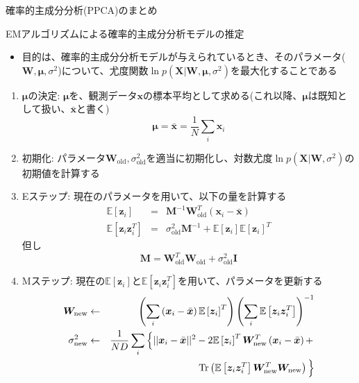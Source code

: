 \documentclass[dvipdfmx,notheorems,t]{beamer}
\begin{document}
\begin{frame}{確率的主成分分析(PPCA)のまとめ}

\begin{block}{EMアルゴリズムによる確率的主成分分析モデルの推定}
	\begin{itemize}
		\item 目的は、確率的主成分分析モデルが与えられているとき、そのパラメータ($\bm{W}, \bm{\mu}, \sigma^2$)について、尤度関数$\ln p(\bm{X} | \bm{W}, \bm{\mu}, \sigma^2)$を最大化することである
	\end{itemize}
\end{block}

\begin{enumerate}
	\item \color{red}$\bm{\mu}$の決定\normalcolor : $\bm{\mu}$を、観測データ$\bm{x}$の標本平均として求める(これ以降、$\bm{\mu}$は既知として扱い、$\bar{\bm{x}}$と書く)
	\begin{equation}
		\bm{\mu} = \bar{\bm{x}} = \frac{1}{N} \sum_i \bm{x}_i
	\end{equation}
	
	\item \color{red}初期化\normalcolor : パラメータ$\bm{W}_\mathrm{old}, \sigma^2_\mathrm{old}$を適当に初期化し、対数尤度$\ln p(\bm{X} | \bm{W}, \sigma^2)$の初期値を計算する
	\newline
	
	\item \color{red}Eステップ\normalcolor : 現在のパラメータを用いて、以下の量を計算する \label{enum:ppca-e-step}
	\begin{eqnarray}
		\mathbb{E} \left[ \bm{z}_i \right] &=& \bm{M}^{-1} \bm{W}_\mathrm{old}^T \left( \bm{x}_i - \bar{\bm{x}} \right) \\
			\mathbb{E} \left[ \bm{z}_i \bm{z}_i^T \right] &=& \sigma^2_\mathrm{old} \bm{M}^{-1} + \mathbb{E} \left[ \bm{z}_i \right] \mathbb{E} \left[ \bm{z}_i \right]^T
	\end{eqnarray}
	但し
	\begin{equation}
		\bm{M} = \bm{W}_\mathrm{old}^T \bm{W}_\mathrm{old} + \sigma^2_\mathrm{old} \bm{I}
	\end{equation}
	\newline
	
	\item \color{red}Mステップ\normalcolor : 現在の$\mathbb{E} \left[ \bm{z}_i \right]$と$\mathbb{E} \left[ \bm{z}_i \bm{z}_i^T \right]$を用いて、パラメータを更新する
	\begin{eqnarray}
		\bm{W}_\mathrm{new} &\leftarrow& \left( \sum_i \left( \bm{x}_i - \bar{\bm{x}} \right) \mathbb{E} \left[ \bm{z}_i \right]^T \right) \left( \sum_i \mathbb{E} \left[ \bm{z}_i \bm{z}_i^T \right] \right)^{-1} \\
		\sigma^2_\mathrm{new} &\leftarrow& \frac{1}{ND} \sum_i \left\{ || \bm{x}_i - \bar{\bm{x}} ||^2 - 2 \mathbb{E} \left[ \bm{z}_i \right]^T \bm{W}_\mathrm{new}^T \left( \bm{x}_i - \bar{\bm{x}} \right) + \right. \nonumber \\
		&& \qquad \operatorname{Tr} \left( \mathbb{E} \left[ \bm{z}_i \bm{z}_i^T \right] \bm{W}_\mathrm{new}^T \bm{W}_\mathrm{new} \right) \Big\}
	\end{eqnarray}
	\newline
	

\end{enumerate}
\end{frame}
\end{document}
